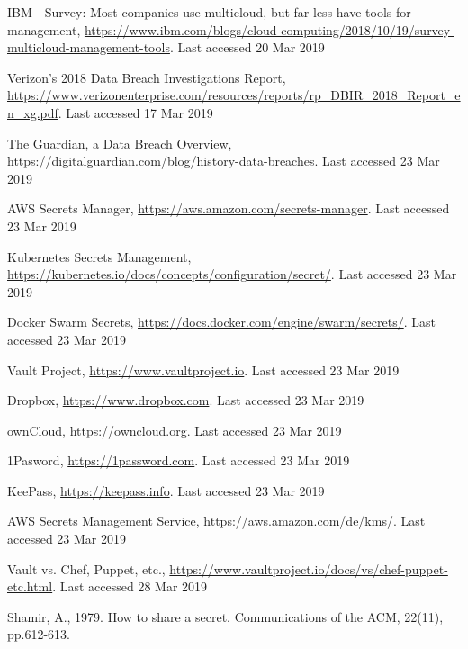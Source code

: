 \documentclass[runningheads]{llncs}
\begin{document}
\begin{thebibliography}{8}

IBM - Survey: Most companies use multicloud, but far less have tools for management, \url{https://www.ibm.com/blogs/cloud-computing/2018/10/19/survey-multicloud-management-tools}. Last accessed 20
Mar 2019

Verizon’s 2018 Data Breach Investigations Report, \url{https://www.verizonenterprise.com/resources/reports/rp_DBIR_2018_Report_en_xg.pdf}. Last accessed 17
Mar 2019

The Guardian, a Data Breach Overview, \url{https://digitalguardian.com/blog/history-data-breaches}. Last accessed 23
Mar 2019

AWS Secrets Manager, \url{https://aws.amazon.com/secrets-manager}. Last accessed 23
Mar 2019

Kubernetes Secrets Management, \url{https://kubernetes.io/docs/concepts/configuration/secret/}. Last accessed 23
Mar 2019

Docker Swarm Secrets, \url{https://docs.docker.com/engine/swarm/secrets/}. Last accessed 23
Mar 2019

Vault Project, \url{https://www.vaultproject.io}. Last accessed 23
Mar 2019


Dropbox, \url{https://www.dropbox.com}. Last accessed 23
Mar 2019

ownCloud, \url{https://owncloud.org}. Last accessed 23
Mar 2019

1Pasword, \url{https://1password.com}. Last accessed 23
Mar 2019

KeePass, \url{https://keepass.info}. Last accessed 23
Mar 2019

AWS Secrets Management Service, \url{https://aws.amazon.com/de/kms/}. Last accessed 23
Mar 2019

Vault vs. Chef, Puppet, etc., \url{https://www.vaultproject.io/docs/vs/chef-puppet-etc.html}. Last accessed 28
Mar 2019

Shamir, A., 1979. How to share a secret. Communications of the ACM, 22(11), pp.612-613.


\end{thebibliography}
\end{document}
